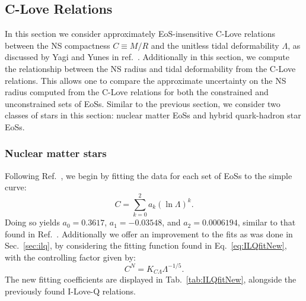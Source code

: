 \documentclass[prd,twocolumn,nofootinbib,superscriptaddress,amsmath,amssymb]{revtex4-1}
\begin{document}
\subsection{C-Love Relations}\label{sec:clove}
In this section we consider approximately EoS-insensitive C-Love relations between the NS compactness $C \equiv M/R$ and the unitless tidal deformability $\Lambda$, as discussed by Yagi and Yunes in ref.~\cite{Yagi:binLove}.
Additionally in this section, we compute the relationship between the NS radius and tidal deformability from the C-Love relations.
This allows one to compare the approximate uncertainty on the NS radius computed from the C-Love relations for both the constrained and unconstrained sets of EoSs. 
Similar to the previous section, we consider two classes of stars in this section: nuclear matter EoSs and hybrid quark-hadron star EoSs.

\subsubsection{Nuclear matter stars}\label{sec:clove-nuc}
Following Ref.~\cite{Yagi:binLove}, we begin by fitting the data for each set of EoSs to the simple curve:
\begin{equation}
C = \sum^2_{k=0} a_k (\ln{\Lambda})^k.
\end{equation}
Doing so yields $a_0 = 0.3617$, $a_1 = -0.03548$, and $a_2 = 0.0006194$, similar to that found in Ref.~\cite{Yagi:binLove}.
Additionally we offer an improvement to the fits as was done in Sec.~\ref{sec:ilq}, by considering the fitting function found in Eq.~\ref{eq:ILQfitNew}, with the controlling factor given by:
\begin{equation}
C^N=K_{C\Lambda}\Lambda^{-1/5}.\label{eq:cloveFit}
\end{equation}
The new fitting coefficients are displayed in Tab.~\ref{tab:ILQfitNew}, alongside the previously found I-Love-Q relations.
\end{document}
